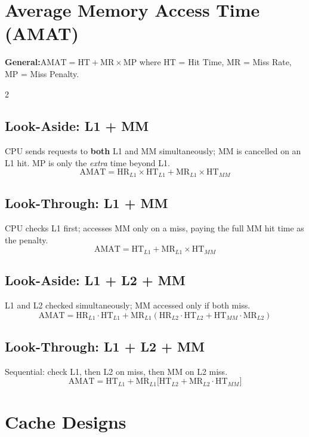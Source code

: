 \documentclass[9pt]{article}
\begin{document}
\section{Average Memory Access Time (AMAT)}

\textbf{General:}\enspace $\text{AMAT} = \text{HT} + \text{MR} \times \text{MP}$\enspace
where HT = Hit Time, MR = Miss Rate, MP = Miss Penalty.

\vspace{3pt}
\begin{multicols}{2}

\subsection{Look-Aside: L1 + MM}
CPU sends requests to \textbf{both} L1 and MM simultaneously; MM is cancelled on an L1 hit. MP is only the \emph{extra} time beyond L1.
$$\text{AMAT} = \text{HR}_{L1} \times \text{HT}_{L1} + \text{MR}_{L1} \times \text{HT}_{MM}$$

\subsection{Look-Through: L1 + MM}
CPU checks L1 first; accesses MM only on a miss, paying the full MM hit time as the penalty.
$$\text{AMAT} = \text{HT}_{L1} + \text{MR}_{L1} \times \text{HT}_{MM}$$

\columnbreak

\subsection{Look-Aside: L1 + L2 + MM}
L1 and L2 checked simultaneously; MM accessed only if both miss.
$$\text{AMAT} = \text{HR}_{L1} \cdot \text{HT}_{L1} + \text{MR}_{L1}(\text{HR}_{L2} \cdot \text{HT}_{L2} + \text{HT}_{MM} \cdot \text{MR}_{L2})$$

\subsection{Look-Through: L1 + L2 + MM}
Sequential: check L1, then L2 on miss, then MM on L2 miss.
$$\text{AMAT} = \text{HT}_{L1} + \text{MR}_{L1}\bigl[\text{HT}_{L2} + \text{MR}_{L2} \cdot \text{HT}_{MM}\bigr]$$

\end{multicols}

\section{Cache Designs}
\end{document}
